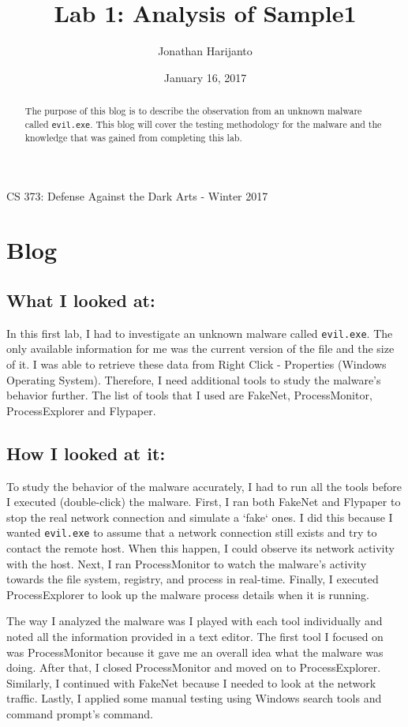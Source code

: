 \documentclass[letterpaper,10pt,titlepage,draftclsnofoot,onecolumn]{IEEEtran}
\title{Lab 1: Analysis of Sample1}
\author{Jonathan Harijanto}
\date{January 16, 2017}
\begin{document}
\maketitle
\begin{center}
CS 373: Defense Against the Dark Arts - Winter 2017
\vfill
\end{center}
\begin{abstract}

The purpose of this blog is to describe the observation from an unknown malware called \verb|evil.exe|. 
This blog will cover the testing methodology for the malware and the knowledge that was gained from completing this lab. 
\end{abstract}
\newpage

\section{Blog}

\subsection{What I looked at:}
In this first lab, I had to investigate an unknown malware called \verb|evil.exe|. 
The only available information for me was the current version of the file and the size of it. 
I was able to retrieve these data from Right Click - Properties (Windows Operating System).
Therefore, I need additional tools to study the malware's behavior further. 
The list of tools that I used are FakeNet, ProcessMonitor, ProcessExplorer and Flypaper. 

\subsection{How I looked at it:}
To study the behavior of the malware accurately, I had to run all the tools before I executed (double-click) the malware. 
First, I ran both FakeNet and Flypaper to stop the real network connection and simulate a `fake` ones. 
I did this because I wanted \verb|evil.exe| to assume that a network connection still exists and try to contact the remote host. 
When this happen, I could observe its network activity with the host. 
Next, I ran ProcessMonitor to watch the malware's activity towards the file system, registry, and process in real-time. 
Finally, I executed ProcessExplorer to look up the malware process details when it is running.

The way I analyzed the malware was I played with each tool individually and noted all the information provided in a text editor.  
The first tool I focused on was ProcessMonitor because it gave me an overall idea what the malware was doing. 
After that, I closed ProcessMonitor and moved on to ProcessExplorer. 
Similarly, I continued with FakeNet because I needed to look at the network traffic. 
Lastly, I applied some manual testing using Windows search tools and command prompt's command.
\end{document}
